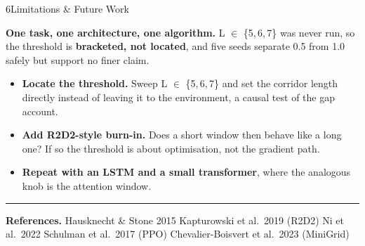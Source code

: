\documentclass[final]{article}
\newcommand{\pbodys}{\fontsize{24}{31}\selectfont}
\newcommand{\ptiny}{\fontsize{19}{25}\selectfont\color{mutedgrey}}
\newlength{\lcolw}\setlength{\lcolw}{315mm}
\newlength{\colgap}\setlength{\colgap}{8mm}
\newlength{\colh}\setlength{\colh}{985mm}
\newcommand{\panelgap}{\vspace{10mm}\vfill}
\begin{document}
\begin{minipage}[t][\colh][s]{\lcolw}
\panelgap

\begin{panel}{6}{Limitations \& Future Work}
  {\pbodys
   \textbf{One task, one architecture, one algorithm.} L \ensuremath{\in}
   \{5,\,6,\,7\} was never run, so the threshold is \textbf{bracketed, not
   located}, and five seeds separate 0.5 from 1.0 safely but support no finer
   claim.
   \begin{itemize}[leftmargin=8mm,itemsep=4mm,topsep=5mm,parsep=0pt]
     \item \textbf{Locate the threshold.} Sweep L \ensuremath{\in}
           \{5,\,6,\,7\} and set the corridor length directly instead of
           leaving it to the environment, a causal test of the gap account.
     \item \textbf{Add R2D2-style burn-in.} Does a short window then behave
           like a long one? If so the threshold is about optimisation, not the
           gradient path.
     \item \textbf{Repeat with an LSTM and a small transformer}, where the
           analogous knob is the attention window.
   \end{itemize}\par}
  \vspace{5mm}
  {\color{hairline}\rule{\linewidth}{0.8mm}}
  \vspace{3mm}
  {\ptiny \textbf{References.} Hausknecht \& Stone 2015 \textperiodcentered{}
   Kapturowski et al.\ 2019 (R2D2) \textperiodcentered{} Ni et al.\ 2022
   \textperiodcentered{} Schulman et al.\ 2017 (PPO) \textperiodcentered{}
   Chevalier-Boisvert et al.\ 2023 (MiniGrid)\par}
\end{panel}

\end{minipage}%
\hspace{\colgap}%
\end{document}
